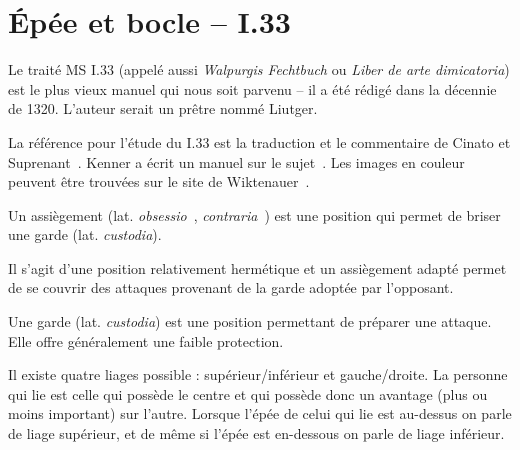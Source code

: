 \chapter{Épée et bocle -- I.33}



Le traité MS I.33 (appelé aussi \emph{Walpurgis Fechtbuch} ou \emph{Liber de arte dimicatoria}) est le plus vieux manuel qui nous soit parvenu – il a été rédigé dans la décennie de 1320.
L'auteur serait un prêtre nommé Liutger.

La référence pour l'étude du I.33 est la traduction et le commentaire de Cinato et Suprenant~\cite{cinato:I33:2009}.
Kenner a écrit un manuel sur le sujet~\cite{kenner:I33:2014}.
Les images en couleur peuvent être trouvées sur le site de Wiktenauer~\cite{wiktenauer:I33}.



\begin{definition}[Assiègement]

Un assiègement (lat. \emph{obsessio}~\cite{cinato:I33:2009}, \emph{contraria}~\cite{kenner:I33:2014}) est une position qui permet de briser une garde (lat. \emph{custodia}).

Il s'agit d'une position relativement hermétique et un assiègement adapté permet de se couvrir des attaques provenant de la garde adoptée par l'opposant.
\end{definition}



\begin{definition}

Une garde (lat. \emph{custodia}) est une position permettant de préparer une attaque.
Elle offre généralement une faible protection.
\end{definition}


Il existe quatre liages possible : supérieur/inférieur et gauche/droite.
La personne qui lie est celle qui possède le centre et qui possède donc un avantage (plus ou moins important) sur l'autre.
Lorsque l'épée de celui qui lie est au-dessus on parle de liage supérieur, et de même si l'épée est en-dessous on parle de liage inférieur.

